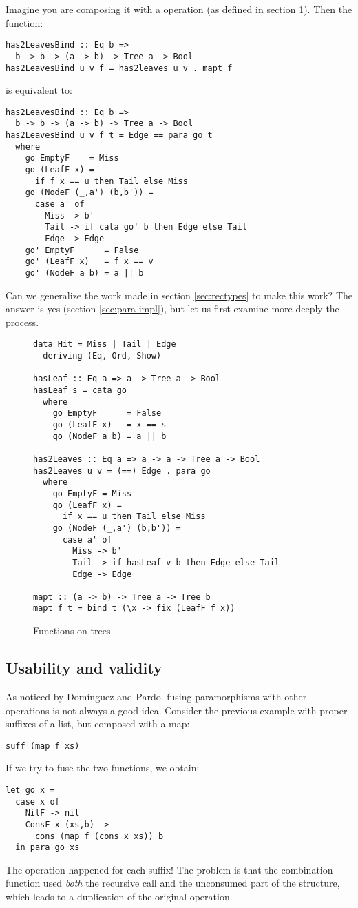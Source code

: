 Imagine you are composing it with a  operation (as defined in section \ref{fig:has2Leaves}). Then
the function:
\begin{verbatim}
has2LeavesBind :: Eq b =>
  b -> b -> (a -> b) -> Tree a -> Bool
has2LeavesBind u v f = has2leaves u v . mapt f
\end{verbatim}
\noindent is equivalent to:
\begin{verbatim}
has2LeavesBind :: Eq b =>
  b -> b -> (a -> b) -> Tree a -> Bool
has2LeavesBind u v f t = Edge == para go t
  where
    go EmptyF    = Miss
    go (LeafF x) =
      if f x == u then Tail else Miss
    go (NodeF (_,a') (b,b')) =
      case a' of
        Miss -> b'
        Tail -> if cata go' b then Edge else Tail
        Edge -> Edge
    go' EmptyF      = False
    go' (LeafF x)   = f x == v
    go' (NodeF a b) = a || b
\end{verbatim}

\noindent Can we generalize the work made in section \ref{sec:rectypes} to make this work? The answer is yes (section \ref{sec:para-impl}), but let us first examine more deeply the process.

\begin{figure}
\begin{verbatim}
data Hit = Miss | Tail | Edge
  deriving (Eq, Ord, Show)

hasLeaf :: Eq a => a -> Tree a -> Bool
hasLeaf s = cata go
  where
    go EmptyF      = False
    go (LeafF x)   = x == s
    go (NodeF a b) = a || b

has2Leaves :: Eq a => a -> a -> Tree a -> Bool
has2Leaves u v = (==) Edge . para go
  where
    go EmptyF = Miss
    go (LeafF x) =
      if x == u then Tail else Miss
    go (NodeF (_,a') (b,b')) =
      case a' of
        Miss -> b'
        Tail -> if hasLeaf v b then Edge else Tail
        Edge -> Edge

mapt :: (a -> b) -> Tree a -> Tree b
mapt f t = bind t (\x -> fix (LeafF f x))
\end{verbatim}
\caption{Functions on trees}
\label{fig:has2Leaves}
\end{figure}

\subsection{Usability and validity}
As noticed by Domínguez and Pardo. \cite{paramorphismFusion} fusing paramorphisms with other operations is not always a good idea. Consider the previous example with proper suffixes of a list, but composed with a map:
\begin{verbatim}
suff (map f xs)
\end{verbatim}
\noindent If we try to fuse the two functions, we obtain:
\begin{verbatim}
let go x =
  case x of
    NilF -> nil
    ConsF x (xs,b) ->
      cons (map f (cons x xs)) b
  in para go xs
\end{verbatim}
\noindent The  operation happened for each suffix! The problem is that the combination function used \emph{both} the recursive call and the unconsumed part of the structure, which leads to a duplication of the original  operation.

